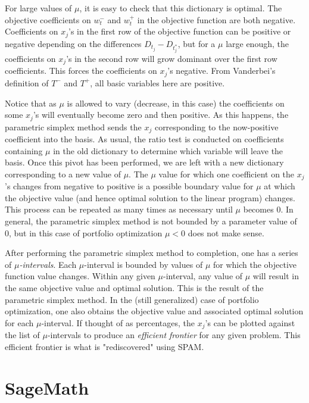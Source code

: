 \documentclass{article}
\begin{document}
For large values of $\mu$, it is easy to check that this dictionary is optimal. The objective coefficients on $w_t^-$ and $w_t^+$ in the objective function are both negative. Coefficients on $x_j$'s in the first row of the objective function can be positive or negative depending on the differences $D_t_j - D_t_j^*$, but for a $\mu$ large enough, the coefficients on $x_j$'s in the second row will grow dominant over the first row coefficients. This forces the coefficients on $x_j$'s negative. From Vanderbei's definition of $T^-$ and $T^+$, all basic variables here are positive. 

Notice that as $\mu$ is allowed to vary (decrease, in this case) the coefficients on some $x_j$'s will eventually become zero and then positive. As this happens, the parametric simplex method sends the $x_j$ corresponding to the now-positive coefficient into the basis. As usual, the ratio test is conducted on coefficients containing $\mu$ in the old dictionary to determine which variable will leave the basis. Once this pivot has been performed, we are left with a new dictionary corresponding to a new value of $\mu$. The $\mu$ value for which one coefficient on the $x_j$'s changes from negative to positive is a possible boundary value for $\mu$ at which the objective value (and hence optimal solution to the linear program) changes. This process can be repeated as many times as necessary until $\mu$ becomes 0. In general, the parametric simplex method is not bounded by a parameter value of 0, but in this case of portfolio optimization $\mu < 0$ does not make sense.

After performing the parametric simplex method to completion, one has a series of $\mu$\textit{-intervals}. Each $\mu$-interval is bounded by values of $\mu$ for which the objective function value changes. Within any given $\mu$-interval, any value of $\mu$ will result in the same objective value and optimal solution. This is the result of the parametric simplex method. In the (still generalized) case of portfolio optimization, one also obtains the objective value and associated optimal solution for each $\mu$-interval. If thought of as percentages, the $x_j$'s can be plotted against the list of $\mu$-intervals to produce an \textit{efficient frontier} for any given problem. This efficient frontier is what is "rediscovered" using SPAM.

\section{SageMath}
\end{document}
